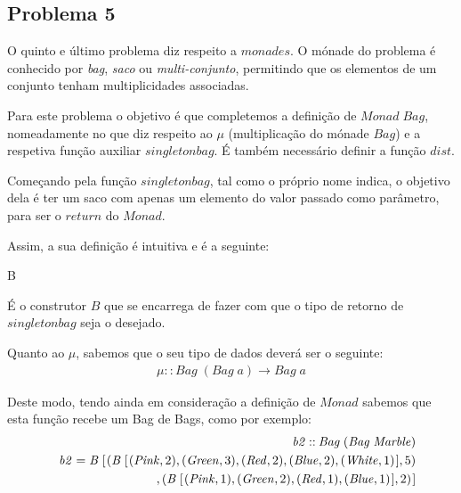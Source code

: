\documentclass[a4paper]{article}
\newcommand{\Conid}[1]{\mathit{#1}}
\newcommand{\Varid}[1]{\mathit{#1}}
\def\resethooks{%
  \global\let\SaveRestoreHook\empty
  \global\let\ColumnHook\empty}
\let\hspre\empty
\let\hspost\empty
\begin{document}
\subsection*{Problema 5}

O quinto e último problema diz respeito a \ensuremath{\Varid{monades}}. O mónade do
problema é conhecido por \emph{bag}, \emph{saco}
ou \emph{multi-conjunto}, permitindo que os elementos de um
conjunto tenham multiplicidades associadas.

Para este problema o objetivo é que completemos a definição
de \ensuremath{\Conid{Monad}\;\Conid{Bag}}, nomeadamente no que diz respeito
ao \ensuremath{\mu } (multiplicação do mónade \ensuremath{\Conid{Bag}}) e a respetiva
função auxiliar \ensuremath{\Varid{singletonbag}}. É também necessário definir
a função \ensuremath{\Varid{dist}}.

\vspace{0.4cm}

Começando pela função \ensuremath{\Varid{singletonbag}}, tal como o próprio nome indica,
o objetivo dela é ter um saco com apenas um elemento do valor passado como
parâmetro, para ser o \ensuremath{\Varid{return}} do \ensuremath{\Conid{Monad}}.

Assim, a sua definição é intuitiva e é a seguinte:
\begin{hscode}\SaveRestoreHook
\column{B}{@{}>{\hspre}l<{\hspost}@{}}%
\column{E}{@{}>{\hspre}l<{\hspost}@{}}%
\>[B]{}\Varid{singletonbag}\;\Varid{a}\mathrel{=}\mathit B\;[\mskip1.5mu (\Varid{a},\mathrm{1})\mskip1.5mu]{}\<[E]%
\ColumnHook
\end{hscode}\resethooks

É o construtor \ensuremath{\mathit B} que se encarrega de fazer com que o
tipo de retorno de \ensuremath{\Varid{singletonbag}} seja o desejado.

\vspace{0.3cm}

Quanto ao \ensuremath{\mu }, sabemos que o seu tipo de dados deverá ser o seguinte:
\begin{eqnarray*}
\ensuremath{\mu \mathbin{::}\Conid{Bag}\;(\Conid{Bag}\;\Varid{a})\to \Conid{Bag}\;\Varid{a}}
\end{eqnarray*}

Deste modo, tendo ainda em consideração a definição de \ensuremath{\Conid{Monad}}
sabemos que esta função recebe um Bag de Bags, como por
exemplo:
\begin{eqnarray*}
\start
\ensuremath{\Varid{b2}\mathbin{::}\Conid{Bag}\;(\Conid{Bag}\;\Conid{Marble})}
\more
\ensuremath{\Varid{b2}\mathrel{=}\mathit B\;[\mskip1.5mu (\mathit B\;[\mskip1.5mu (\Conid{Pink},\mathrm{2}),(\Conid{Green},\mathrm{3}),(\Conid{Red},\mathrm{2}),(\Conid{Blue},\mathrm{2}),(\Conid{White},\mathrm{1})\mskip1.5mu],\mathrm{5})}
\more
\ensuremath{,(\mathit B\;[\mskip1.5mu (\Conid{Pink},\mathrm{1}),(\Conid{Green},\mathrm{2}),(\Conid{Red},\mathrm{1}),(\Conid{Blue},\mathrm{1})\mskip1.5mu],\mathrm{2})\mskip1.5mu]}
\end{eqnarray*}
\end{document}
